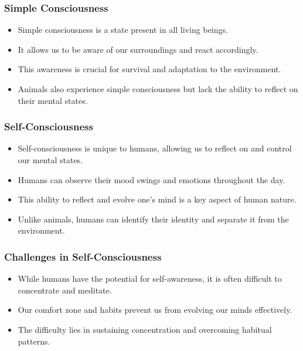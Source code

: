 \begin{frame}[fragile]\frametitle{Simple Consciousness}
  \begin{itemize}
    \item Simple consciousness is a state present in all living beings.
    \item It allows us to be aware of our surroundings and react accordingly.
    \item This awareness is crucial for survival and adaptation to the environment.
    \item Animals also experience simple consciousness but lack the ability to reflect on their mental states.
  \end{itemize}
\end{frame}

\begin{frame}[fragile]\frametitle{Self-Consciousness}
  \begin{itemize}
    \item Self-consciousness is unique to humans, allowing us to reflect on and control our mental states.
    \item Humans can observe their mood swings and emotions throughout the day.
    \item This ability to reflect and evolve one's mind is a key aspect of human nature.
    \item Unlike animals, humans can identify their identity and separate it from the environment.
  \end{itemize}
\end{frame}

\begin{frame}[fragile]\frametitle{Challenges in Self-Consciousness}
  \begin{itemize}
    \item While humans have the potential for self-awareness, it is often difficult to concentrate and meditate.
    \item Our comfort zone and habits prevent us from evolving our minds effectively.
    \item The difficulty lies in sustaining concentration and overcoming habitual patterns.
  \end{itemize}
\end{frame}


